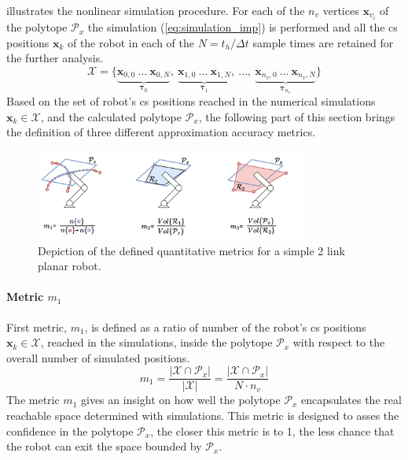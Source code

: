  illustrates the nonlinear simulation procedure. For each of the $n_v$ vertices $\bm{x}_{v_i}$ of the polytope $\mathcal{P}_x$ the simulation (\ref{eq:simulation_imp}) is performed and all the \gls{cs} positions $\bm{x}_k$ of the robot in each of the $N=t_h/\Delta t$ sample times are retained for the further analysis. $$
\mathcal{X} = \{\underbrace{\bm{x}_{0,0}~\dots ~\bm{x}_{0,N}}_{\bm{\tau}_0},~\underbrace{\bm{x}_{1,0}~\dots~\bm{x}_{1,N}}_{\bm{\tau}_1},~\dots, ~ \underbrace{\bm{x}_{n_v,0}~\dots~\bm{x}_{n_v,N}}_{\bm{\tau}_{n_v}}\}
$$
Based on the set of robot's \gls{cs} positions reached in the numerical simulations $\bm{x}_k\in \mathcal{X}$, and the calculated polytope $\mathcal{P}_x$, the following part of this section brings the definition of three different approximation accuracy metrics.

\begin{figure}[!t]
    \centering
    \includegraphics[width=0.8\textwidth]{Papers/images/metrics.pdf}
    \caption{Depiction of the defined quantitative metrics for a simple 2 link planar robot. }
    \label{fig:metrics_defintition}

\end{figure}

\paragraph*{Metric $m_1$} First metric, $m_1$, is defined as a ratio of number of the robot's \gls{cs} positions $\bm{x}_k\in \mathcal{X}$, reached in the simulations, inside the polytope $\mathcal{P}_x$ with respect to the overall number of simulated positions. 
\begin{equation}
    m_1 = \frac{|\mathcal{X}\cap\mathcal{P}_x|}{|\mathcal{X}|} = \frac{|\mathcal{X}\cap\mathcal{P}_x|}{N\cdot n_v}
\end{equation}
The metric $m_1$ gives an insight on how well the polytope $\mathcal{P}_x$ encapsulates the real reachable space determined with simulations. This metric is designed to asses the confidence in the polytope $\mathcal{P}_x$, the closer this metric is to 1, the less chance that the robot can exit the space bounded by $\mathcal{P}_x$.

